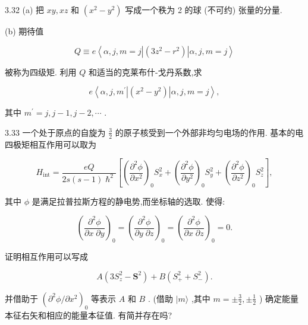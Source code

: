 3.32 (a) 把 ${xy},{xz}$ 和 $\left( {{x}^{2} - {y}^{2}}\right)$ 写成一个秩为 2 的球 (不可约) 张量的分量.

(b) 期待值

$$
Q \equiv e\left\langle {\alpha, j, m = j\left| \left( {3{z}^{2} - {r}^{2}}\right) \right| \alpha, j, m = j}\right\rangle
$$

被称为四级矩. 利用 $Q$ 和适当的克莱布什-戈丹系数,求

$$
e\left\langle {\alpha, j,{m}^{\prime }\left| \left( {{x}^{2} - {y}^{2}}\right) \right| \alpha, j, m = j}\right\rangle ,
$$

其中 ${m}^{\prime } = j, j - 1, j - 2,\cdots$ .

3.33 一个处于原点的自旋为 $\frac{3}{2}$ 的原子核受到一个外部非均匀电场的作用. 基本的电四极矩相互作用可以取为

$$
{H}_{\mathrm{{int}}} = \frac{eQ}{{2s}\left( {s - 1}\right) {\hslash }^{2}}\left\lbrack {{\left( \frac{{\partial }^{2}\phi }{\partial {x}^{2}}\right) }_{0}{S}_{x}^{2} + {\left( \frac{{\partial }^{2}\phi }{\partial {y}^{2}}\right) }_{0}{S}_{y}^{2} + {\left( \frac{{\partial }^{2}\phi }{\partial {z}^{2}}\right) }_{0}{S}_{z}^{2}}\right\rbrack ,
$$

其中 $\phi$ 是满足拉普拉斯方程的静电势,而坐标轴的选取. 使得:

$$
{\left( \frac{{\partial }^{2}\phi }{\partial x\;\partial y}\right) }_{0} = {\left( \frac{{\partial }^{2}\phi }{\partial y\;\partial z}\right) }_{0} = {\left( \frac{{\partial }^{2}\phi }{\partial x\;\partial z}\right) }_{0} = 0.
$$

证明相互作用可以写成

$$
A\left( {3{S}_{z}^{2} - {\mathbf{S}}^{2}}\right) + B\left( {{S}_{ + }^{2} + {S}_{ - }^{2}}\right) .
$$

并借助于 ${\left( {\partial }^{2}\phi /\partial {x}^{2}\right) }_{0}$ 等表示 $A$ 和 $B$ . (借助 $|m\rangle$ ,其中 $m = \pm \frac{3}{2}, \pm \frac{1}{2}$ ) 确定能量本征右矢和相应的能量本征值. 有简并存在吗?



	
	
	
	
	
\ifx\allfiles\undefined

	\else
	\fi
